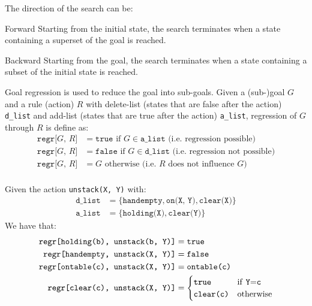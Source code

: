 The direction of the search can be:
\begin{descriptionlist}
    \item[Forward] 
        Starting from the initial state, the search terminates when a state containing a superset of the goal is reached.
    \item[Backward] 
        Starting from the goal, the search terminates when a state containing a subset of the initial state is reached.

        Goal regression is used to reduce the goal into sub-goals.
        Given a (sub-)goal $G$ and a rule (action) $R$ with delete-list (states that are false after the action) \texttt{d\_list}
        and add-list (states that are true after the action) \texttt{a\_list}, regression of $G$ through $R$ is define as:
        \[
            \begin{split}
                \texttt{regr[$G$, $R$]} &= \texttt{true} \text{ if } G \in \texttt{a\_list} \text{ (i.e. regression possible)} \\
                \texttt{regr[$G$, $R$]} &= \texttt{false} \text{ if } G \in \texttt{d\_list} \text{ (i.e. regression not possible)} \\
                \texttt{regr[$G$, $R$]} &= G \text{ otherwise} \text{ (i.e. $R$ does not influence $G$)} \\
            \end{split}  
        \]

        \begin{example}
            Given the action \texttt{unstack(X, Y)} with:
            \[
                \begin{split}
                    \texttt{d\_list} &= \{ \texttt{handempty}, \texttt{on(X, Y)}, \texttt{clear(X)} \} \\
                    \texttt{a\_list} &= \{ \texttt{holding(X)}, \texttt{clear(Y)} \}
                \end{split}
            \]
            We have that:
            \[
                \begin{split}
                    \texttt{regr[holding(b), unstack(b, Y)]} &= \texttt{true} \\
                    \texttt{regr[handempty, unstack(X, Y)]}  &= \texttt{false} \\
                    \texttt{regr[ontable(c), unstack(X, Y)]} &= \texttt{ontable(c)} \\
                    \texttt{regr[clear(c), unstack(X, Y)]} &= \begin{cases}
                        \texttt{true} & \text{if \texttt{Y}=\texttt{c}} \\
                        \texttt{clear(c)} & \text{otherwise}
                    \end{cases}
                \end{split}  
            \]
        \end{example}
\end{descriptionlist}


